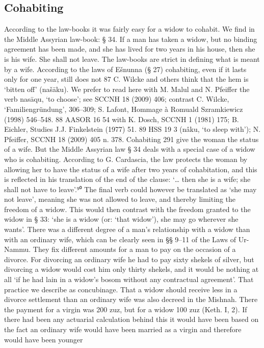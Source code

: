 \documentclass[11pt]{article}
\begin{document}
{\subsection{Cohabiting}
According to the law-books it was fairly easy for a widow to cohabit. We find in
the Middle Assyrian law-book:
§ 34. If a man has taken a widow, but no binding agreement has been made, and she has
lived for two years in his house, then she is his wife. She shall not leave.
The law-books are strict in defining what is meant by a wife. According to the
laws of Ešnunna (§ 27) cohabiting, even if it lasts only for one year, still does not
87 C. Wilcke and others think that the hem is ‘bitten off’ (našāku). We prefer to read here with
M. Malul and N. Pfeiffer the verb nasāqu, ‘to choose’; see SCCNH 18 (2009) 406; contrast C. Wilcke, ‘Familiengründung’, 306–309; S. Lafont, Hommage à Romuald Szramkiewicz (1998) 546–548.
88 AASOR 16 54 with K. Dosch, SCCNH 1 (1981) 175; B. Eichler, Studies J.J. Finkelstein (1977) 51.
89 HSS 19 3 (nâku, ‘to sleep with’); N. Pfeiffer, SCCNH 18 (2009) 405 n. 378.
Cohabiting 291
give the woman the status of a wife. But the Middle Assyrian law § 34 deals with
a special case of a widow who is cohabiting. According to G. Cardascia, the law
protects the woman by allowing her to have the status of a wife after two years
of cohabitation, and this is reflected in his translation of the end of the clause:
‘… then she is a wife; she shall not have to leave’.⁹⁰ The final verb could however
be translated as ‘she may not leave’, meaning she was not allowed to leave,
and thereby limiting the freedom of a widow. This would then contrast with the
freedom granted to the widow in § 33: ‘she is a widow (or: ‘that widow’), she may
go wherever she wants’.
There was a different degree of a man’s relationship with a widow than with
an ordinary wife, which can be clearly seen in §§ 9–11 of the Laws of Ur-Nammu.
They fix different amounts for a man to pay on the occasion of a divorce. For
divorcing an ordinary wife he had to pay sixty shekels of silver, but divorcing a
widow would cost him only thirty shekels, and it would be nothing at all ‘if he
had lain in a widow’s bosom without any contractual agreement’. That practice
we describe as concubinage. That a widow should receive less in a divorce settlement than an ordinary wife was also decreed in the Mishnah. There the payment
for a virgin was 200 zuz, but for a widow 100 zuz (Keth. I, 2). If there had been any
actuarial calculation behind this it would have been based on the fact an ordinary
wife would have been married as a virgin and therefore would have been younger
}
\end{document}
